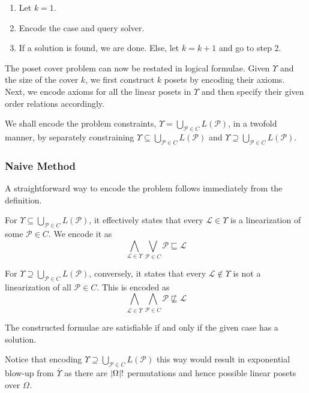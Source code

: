 \documentclass[12pt]{llncs}
\DeclarePairedDelimiter{\abs}{\lvert}{\rvert}
\newcommand{\poset}[1]{\mathcal{#1}}
\newcommand{\uni}[1][]{\Omega_{#1}}
\newcommand{\lang}[1]{L(#1)}
\newcommand{\lext}{\sqsubseteq}
\newcommand{\complmt}[1]{\overline{#1}}
\begin{document}
\begin{enumerate}
    \item Let $k = 1$.
    \item Encode the case and query solver.
    \item If a solution is found, we are done. Else, let $k = k+1$ and go to step 2.
\end{enumerate}

The poset cover problem can now be restated in logical formulae. Given $\Upsilon$ and the size of the cover $k$, we first construct $k$ posets by encoding their axioms. Next, we encode axioms for all the linear posets in $\Upsilon$ and then specify their given order relations accordingly.

We shall encode the problem constraints, $\Upsilon = \bigcup_{\poset{P} \in C} \lang{\poset{P}}$, in a twofold manner, by separately constraining $\Upsilon \subseteq \bigcup_{\poset{P} \in C} \lang{\poset{P}}$ and $\Upsilon \supseteq \bigcup_{\poset{P} \in C} \lang{\poset{P}}$.

\subsubsection{Naive Method} A straightforward way to encode the problem follows immediately from the definition.

For $\Upsilon \subseteq \bigcup_{\poset{P} \in C} \lang{\poset{P}}$, it effectively states that every $\poset{L} \!\in\! \Upsilon$ is a linearization of some $\poset{P} \!\in\! C$. We encode it as
\[
\bigwedge_{\poset{L} \in \Upsilon} \bigvee_{\poset{P} \in C} \poset{P} \lext \poset{L}
\]

For $\Upsilon \supseteq \bigcup_{\poset{P} \in C} \lang{\poset{P}}$, conversely, it states that every $\poset{L} \!\notin\! \Upsilon$ is not a linearization of all $\poset{P} \!\in\! C$. This is encoded as
\[
\bigwedge_{\poset{L} \in \complmt{\Upsilon}} \bigwedge_{\poset{P} \in C} \poset{P} \not\lext \poset{L}
\]

\begin{theorem}
    The constructed formulae are satisfiable if and only if the given case has a solution.
\end{theorem}

Notice that encoding $\Upsilon \supseteq \bigcup_{\poset{P} \in C} \lang{\poset{P}}$ this way would result in exponential blow-up from $\complmt{\Upsilon}$ as there are $\abs{\uni}!$ permutations and hence possible linear posets over $\uni$.
\end{document}
